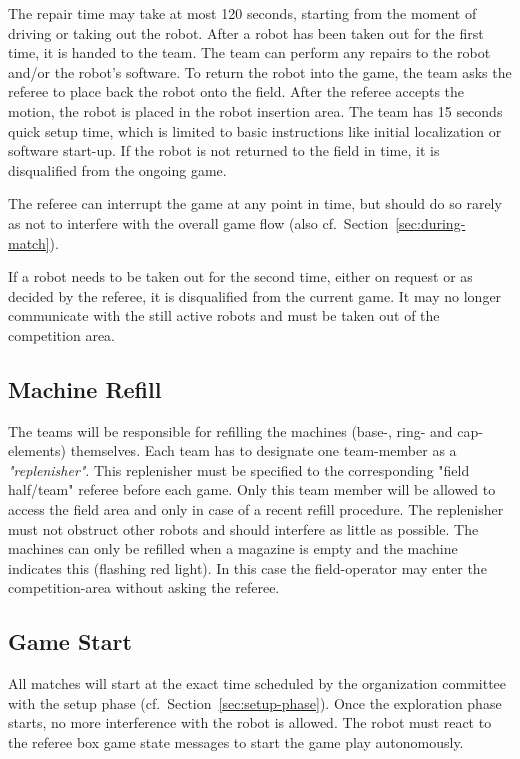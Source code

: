 \documentclass[12pt,twoside]{article}
\newcommand{\refsec}[1]{Section~\ref{#1}}
\begin{document}
The repair time may take at most 120 seconds, starting from the moment
of driving or taking out the robot.  After a robot has been taken out
for the first time, it is handed to the team. The team can perform any
repairs to the robot and/or the robot's
software. %
To return the robot into the game, the team asks the referee to place
back the robot onto the field. After the referee accepts the motion,
the robot is placed in the robot insertion area. The team has 15
seconds quick setup time, which is limited to basic instructions like
initial localization or software start-up.  If the robot is not
returned to the field in time, it is disqualified from the ongoing
game.

The referee can interrupt the game at any point in time, but should do
so rarely as not to interfere with the overall game flow (also
cf.~\refsec{sec:during-match}).

If a robot needs to be taken out for the second time, either on
request or as decided by the referee, it is disqualified from the
current game. It may no longer communicate with the still active
robots and must be taken out of the competition area.


\subsection{Machine Refill}
\label{sec:machine-refill}
The teams will be responsible for refilling the machines (base-, ring-
and cap-elements) themselves.  Each team has to designate one
team-member as a \textit{"replenisher"}.  This replenisher must be 
specified to the corresponding "field half/team" referee before each game.
Only this team member will be allowed to access the field area and 
only in case of a recent refill procedure.  
The replenisher must not obstruct other robots and
should interfere as little as possible.  The machines can only be
refilled when a magazine is empty and the machine indicates this
(flashing red light). In this case the field-operator may enter the
competition-area without asking the referee.

\subsection{Game Start}
\label{sec:game-start}
%
All matches will start at the exact time scheduled by the organization
committee with the setup phase (cf.~\refsec{sec:setup-phase}). Once
the exploration phase starts, no more interference with the robot is
allowed. The robot must react to the referee box game state messages
to start the game play autonomously.
\end{document}
